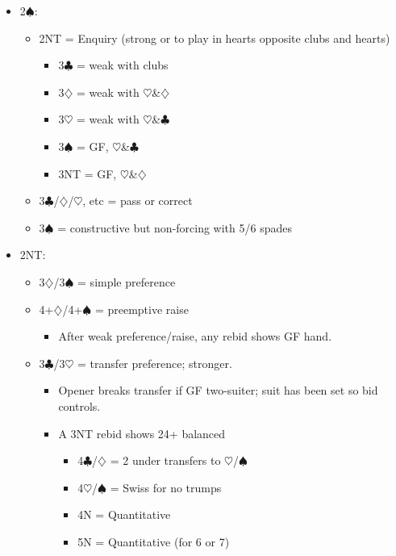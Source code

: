 \documentclass[a4paper,14pt]{extarticle}
\begin{document}
\begin{itemize}
\item 2$\spadesuit$:
	\begin{itemize}
   \item 2NT = Enquiry (strong or to play in hearts opposite clubs and hearts)
		\begin{itemize}
      \item 3$\clubsuit$ = weak with clubs
      \item 3$\diamondsuit$ = weak with $\heartsuit$\&$\diamondsuit$
      \item 3$\heartsuit$ = weak with $\heartsuit$\&$\clubsuit$
      \item 3$\spadesuit$ = GF, $\heartsuit$\&$\clubsuit$
      \item 3NT = GF, $\heartsuit$\&$\diamondsuit$
		\end{itemize}
   \item 3$\clubsuit$/$\diamondsuit$/$\heartsuit$, etc = pass or correct
   \item 3$\spadesuit$ = constructive but non-forcing with 5/6 spades
	\end{itemize}

\item 2NT:
	\begin{itemize}
   \item 3$\diamondsuit$/3$\spadesuit$ = simple preference
   \item 4+$\diamondsuit$/4+$\spadesuit$ = preemptive raise
		\begin{itemize}
      \item After weak preference/raise, any rebid shows GF hand.
		\end{itemize}
   \item 3$\clubsuit$/3$\heartsuit$ = transfer preference; stronger.
		\begin{itemize}
      \item Opener breaks transfer if GF two-suiter; suit has been set so bid controls.
      \item A 3NT rebid shows 24+ balanced
			\begin{itemize}
         \item 4$\clubsuit$/$\diamondsuit$ = 2 under transfers to $\heartsuit$/$\spadesuit$
         \item 4$\heartsuit$/$\spadesuit$ = Swiss for no trumps 
         \item 4N = Quantitative
         \item 5N = Quantitative (for 6 or 7)
			\end{itemize}
		\end{itemize}
	\end{itemize}


\end{itemize}
\end{document}
